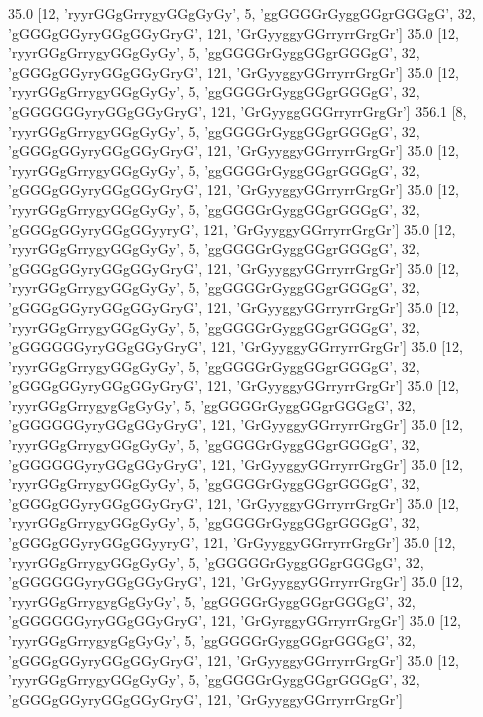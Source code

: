 35.0 [12, 'ryyrGGgGrrygyGGgGyGy', 5, 'ggGGGGrGyggGGgrGGGgG', 32, 'gGGGgGGyryGGgGGyGryG', 121, 'GrGyyggyGGrryrrGrgGr']
35.0 [12, 'ryyrGGgGrrygyGGgGyGy', 5, 'ggGGGGrGyggGGgrGGGgG', 32, 'gGGGgGGyryGGgGGyGryG', 121, 'GrGyyggyGGrryrrGrgGr']
35.0 [12, 'ryyrGGgGrrygyGGgGyGy', 5, 'ggGGGGrGyggGGgrGGGgG', 32, 'gGGGGGGyryGGgGGyGryG', 121, 'GrGyyggGGGrryrrGrgGr']
356.1 [8, 'ryyrGGgGrrygyGGgGyGy', 5, 'ggGGGGrGyggGGgrGGGgG', 32, 'gGGGgGGyryGGgGGyGryG', 121, 'GrGyyggyGGrryrrGrgGr']
35.0 [12, 'ryyrGGgGrrygyGGgGyGy', 5, 'ggGGGGrGyggGGgrGGGgG', 32, 'gGGGgGGyryGGgGGyGryG', 121, 'GrGyyggyGGrryrrGrgGr']
35.0 [12, 'ryyrGGgGrrygyGGgGyGy', 5, 'ggGGGGrGyggGGgrGGGgG', 32, 'gGGGgGGyryGGgGGyyryG', 121, 'GrGyyggyGGrryrrGrgGr']
35.0 [12, 'ryyrGGgGrrygyGGgGyGy', 5, 'ggGGGGrGyggGGgrGGGgG', 32, 'gGGGgGGyryGGgGGyGryG', 121, 'GrGyyggyGGrryrrGrgGr']
35.0 [12, 'ryyrGGgGrrygyGGgGyGy', 5, 'ggGGGGrGyggGGgrGGGgG', 32, 'gGGGgGGyryGGgGGyGryG', 121, 'GrGyyggyGGrryrrGrgGr']
35.0 [12, 'ryyrGGgGrrygyGGgGyGy', 5, 'ggGGGGrGyggGGgrGGGgG', 32, 'gGGGGGGyryGGgGGyGryG', 121, 'GrGyyggyGGrryrrGrgGr']
35.0 [12, 'ryyrGGgGrrygyGGgGyGy', 5, 'ggGGGGrGyggGGgrGGGgG', 32, 'gGGGgGGyryGGgGGyGryG', 121, 'GrGyyggyGGrryrrGrgGr']
35.0 [12, 'ryyrGGgGrrygygGgGyGy', 5, 'ggGGGGrGyggGGgrGGGgG', 32, 'gGGGGGGyryGGgGGyGryG', 121, 'GrGyyggyGGrryrrGrgGr']
35.0 [12, 'ryyrGGgGrrygyGGgGyGy', 5, 'ggGGGGrGyggGGgrGGGgG', 32, 'gGGGGGGyryGGgGGyGryG', 121, 'GrGyyggyGGrryrrGrgGr']
35.0 [12, 'ryyrGGgGrrygyGGgGyGy', 5, 'ggGGGGrGyggGGgrGGGgG', 32, 'gGGGgGGyryGGgGGyGryG', 121, 'GrGyyggyGGrryrrGrgGr']
35.0 [12, 'ryyrGGgGrrygyGGgGyGy', 5, 'ggGGGGrGyggGGgrGGGgG', 32, 'gGGGgGGyryGGgGGyyryG', 121, 'GrGyyggyGGrryrrGrgGr']
35.0 [12, 'ryyrGGgGrrygyGGgGyGy', 5, 'gGGGGGrGyggGGgrGGGgG', 32, 'gGGGGGGyryGGgGGyGryG', 121, 'GrGyyggyGGrryrrGrgGr']
35.0 [12, 'ryyrGGgGrrygygGgGyGy', 5, 'ggGGGGrGyggGGgrGGGgG', 32, 'gGGGGGGyryGGgGGyGryG', 121, 'GrGyrggyGGrryrrGrgGr']
35.0 [12, 'ryyrGGgGrrygygGgGyGy', 5, 'ggGGGGrGyggGGgrGGGgG', 32, 'gGGGgGGyryGGgGGyGryG', 121, 'GrGyyggyGGrryrrGrgGr']
35.0 [12, 'ryyrGGgGrrygyGGgGyGy', 5, 'ggGGGGrGyggGGgrGGGgG', 32, 'gGGGgGGyryGGgGGyGryG', 121, 'GrGyyggyGGrryrrGrgGr']
